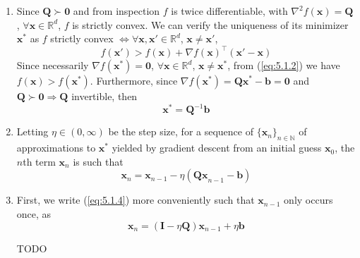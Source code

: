 \documentclass{article}
\numberwithin{equation}{section}
\begin{document}
\begin{enumerate}[label=\alph*.]
    \item
    Since $ \mathbf{Q} \succ \mathbf{0} $ and from inspection $ f $ is twice
    differentiable, with $ \nabla^2f(\mathbf{x}) = \mathbf{Q} $,
    $ \forall \mathbf{x} \in \mathbb{R}^d $, $ f $ is strictly convex. We can
    verify the uniqueness of its minimizer $ \mathbf{x}^* $ as $ f $ strictly
    convex $\Leftrightarrow \forall \mathbf{x}, \mathbf{x}' \in
    \mathbb{R}^d $, $ \mathbf{x} \ne \mathbf{x}' $,
    \begin{equation} \label{eq:5.1.2}
        f(\mathbf{x}') >
        f(\mathbf{x}) + \nabla f(\mathbf{x})^\top(\mathbf{x}' - \mathbf{x})
    \end{equation}
    Since necessarily $ \nabla f(\mathbf{x}^*) = \mathbf{0} $,
    $ \forall \mathbf{x} \in \mathbb{R}^d $, $ \mathbf{x} \ne \mathbf{x}^* $,
    from (\ref{eq:5.1.2}) we have $ f(\mathbf{x}) > f(\mathbf{x}^*) $.
    Furthermore, since $ \nabla f(\mathbf{x}^*) = \mathbf{Qx}^* - \mathbf{b} =
    \mathbf{0} $ and $ \mathbf{Q} \succ \mathbf{0} \Rightarrow \mathbf{Q} $
    invertible, then
    \begin{equation} \label{eq:5.1.3}
        \mathbf{x}^* = \mathbf{Q}^{-1}\mathbf{b}
    \end{equation}

    \item
    Letting $ \eta \in (0, \infty) $ be the step size, for a sequence of
    $ \{\mathbf{x}_n\}_{n \in \mathbb{N}} $ of approximations to
    $ \mathbf{x}^* $ yielded by gradient descent from an initial guess
    $ \mathbf{x}_0 $, the $ n $th term $ \mathbf{x}_n $ is such that
    \begin{equation} \label{eq:5.1.4}
        \mathbf{x}_n =
        \mathbf{x}_{n - 1} - \eta(\mathbf{Qx}_{n - 1} - \mathbf{b})
    \end{equation}

    \item
    First, we write (\ref{eq:5.1.4}) more conveniently such that
    $ \mathbf{x}_{n - 1} $ only occurs once, as
    \begin{equation} \label{eq:5.1.5}
        \mathbf{x}_n =
        (\mathbf{I} - \eta\mathbf{Q})\mathbf{x}_{n - 1} + \eta\mathbf{b}
    \end{equation}

    TODO
\end{enumerate}
\end{document}
